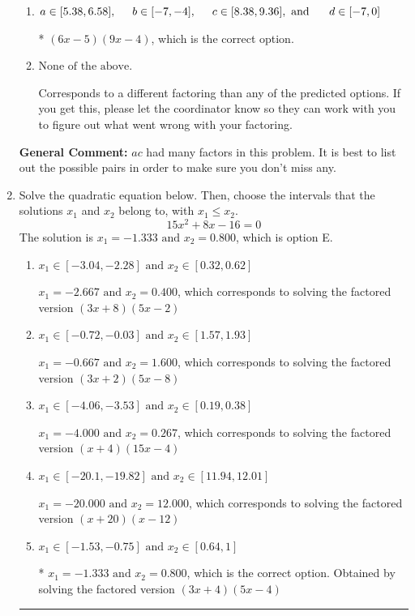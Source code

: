 \documentclass{extbook}[14pt]
\newcommand{\litem}[1]{\item #1

\rule{\textwidth}{0.4pt}}
\begin{document}
\begin{enumerate}
{\begin{enumerate}[label=\Alph*.]
 $(x -45)(x -24)$, which corresponds to factoring $x^{2} -69 x + 1080$.
\item \( a \in [5.38, 6.58], \hspace*{5mm} b \in [-7, -4], \hspace*{5mm} c \in [8.38, 9.36], \text{ and } \hspace*{5mm} d \in [-7, 0] \)

* $(6x -5)(9x -4)$, which is the correct option.
\item \( \text{None of the above.} \)

 Corresponds to a different factoring than any of the predicted options. If you get this, please let the coordinator know so they can work with you to figure out what went wrong with your factoring.
\end{enumerate}

\textbf{General Comment:} $ac$ had many factors in this problem. It is best to list out the possible pairs in order to make sure you don't miss any.
}
\litem{
Solve the quadratic equation below. Then, choose the intervals that the solutions $x_1$ and $x_2$ belong to, with $x_1 \leq x_2$.
\[ 15x^{2} +8 x -16 = 0 \]The solution is \( x_1 = -1.333 \text{ and } x_2 = 0.800 \), which is option E.\begin{enumerate}[label=\Alph*.]
\item \( x_1 \in [-3.04, -2.28] \text{ and } x_2 \in [0.32, 0.62] \)

$x_1 = -2.667 \text{ and } x_2 = 0.400$, which corresponds to solving the factored version $(3x + 8)(5x -2)$
\item \( x_1 \in [-0.72, -0.03] \text{ and } x_2 \in [1.57, 1.93] \)

$x_1 = -0.667 \text{ and } x_2 = 1.600$, which corresponds to solving the factored version $(3x + 2)(5x -8)$
\item \( x_1 \in [-4.06, -3.53] \text{ and } x_2 \in [0.19, 0.38] \)

$x_1 = -4.000 \text{ and } x_2 = 0.267$, which corresponds to solving the factored version $(x + 4)(15x -4)$
\item \( x_1 \in [-20.1, -19.82] \text{ and } x_2 \in [11.94, 12.01] \)

$x_1 = -20.000 \text{ and } x_2 = 12.000$, which corresponds to solving the factored version $(x + 20)(x -12)$
\item \( x_1 \in [-1.53, -0.75] \text{ and } x_2 \in [0.64, 1] \)

* $x_1 = -1.333 \text{ and } x_2 = 0.800$, which is the correct option. Obtained by solving the factored version $(3x + 4)(5x -4)$
\end{enumerate}

}
\end{enumerate}
\end{document}

